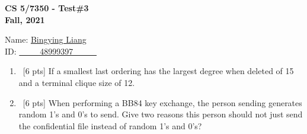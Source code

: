 \documentclass[12pt]{article}
\newenvironment{sol}[1][Solution]{\begin{trivlist}\item[\hskip\labelsep {\bfseries #1:}]}{\end{trivlist}}
\begin{document}
\renewcommand{\qedsymbol}{\filledbox}
\begin{center}
    \textbf{CS 5/7350 - Test\#3} \\
    \textbf{Fall, 2021}
\end{center}
\begin{flushright}
Name: \underline{Bingying Liang }\\
ID:  \underline{\ \ \ \ \ 48999397 \ \ \ \ \ }
\end{flushright}
\begin{enumerate}
    \item \ [6 pts] If a smallest last ordering has the largest degree when deleted of 15 and a terminal clique size of 12.

    \item \ [6 pts] When performing a BB84 key exchange, the person sending generates random 1’s and 0’s to send. Give two reasons this person should not just send the confidential file instead of random 1’s and 0’s?


\end{enumerate}
\end{document}
